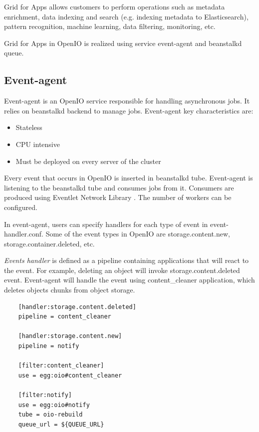     Grid for Apps allows customers to perform operations such as metadata enrichment, data indexing and search (e.g. indexing metadata to Elasticsearch), pattern recognition, machine learning, data filtering, monitoring, etc\cite{oioNextGen}.

    Grid for Apps in OpenIO is realized using service event-agent and beanstalkd queue.

    \subsection{Event-agent}\label{sec:oioEvent-Agent}
    Event-agent is an OpenIO service responsible for handling asynchronous jobs. It relies on beanstalkd backend to manage jobs. Event-agent key characteristics are\cite{oioSdsServices}:
    \begin{itemize}
        \item Stateless
        \item CPU intensive
        \item Must be deployed on every server of the cluster
    \end{itemize}

    Every event that occurs in OpenIO is inserted in beanstalkd tube. Event-agent is listening to the beanstalkd tube and consumes jobs from it. Consumers are produced using Eventlet Network Library \cite{oioEventlet}. The number of workers can be configured.

    In event-agent, users can specify handlers for each type of event in event-handler.conf.
    Some of the event types in OpenIO are storage.content.new, storage.container.deleted, etc.

    \textit{Events handler} is defined as a pipeline containing applications that will react to the event. For example, deleting an object will invoke storage.content.deleted event. Event-agent will handle the event using content\_cleaner application, which deletes objects chunks from object storage.

    \lstset{
        caption=Example of event-agent handler configuration,
        label=lst:event-agent-handlers
    }
    \begin{lstlisting}
    [handler:storage.content.deleted]
    pipeline = content_cleaner

    [handler:storage.content.new]
    pipeline = notify

    [filter:content_cleaner]
    use = egg:oio#content_cleaner

    [filter:notify]
    use = egg:oio#notify
    tube = oio-rebuild
    queue_url = ${QUEUE_URL}
    \end{lstlisting}

